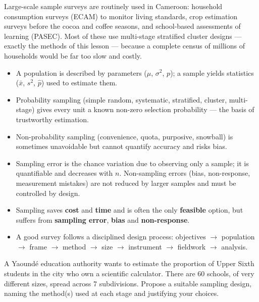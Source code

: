 \documentclass[11pt]{article}
\newcommand{\cle}[1]{{\popxbold\color{popdark}#1}}
\begin{document}
\begin{savaistu}
Large-scale sample surveys are routinely used in Cameroon: household consumption surveys (ECAM) to monitor living standards, crop estimation surveys before the cocoa and coffee seasons, and school-based assessments of learning (PASEC). Most of these use multi-stage stratified cluster designs — exactly the methods of this lesson — because a complete census of millions of households would be far too slow and costly.
\end{savaistu}

\begin{aretenir}
\begin{itemize}
\item A \cle{population} is described by \cle{parameters} ($\mu$, $\sigma^2$, $p$); a \cle{sample} yields \cle{statistics} ($\bar{x}$, $s^2$, $\hat{p}$) used to estimate them.
\item \cle{Probability sampling} (simple random, systematic, stratified, cluster, multi-stage) gives every unit a known non-zero selection probability — the basis of trustworthy estimation.
\item \cle{Non-probability sampling} (convenience, quota, purposive, snowball) is sometimes unavoidable but cannot quantify accuracy and risks bias.
\item \cle{Sampling error} is the chance variation due to observing only a sample; it is quantifiable and decreases with $n$. \cle{Non-sampling errors} (bias, non-response, measurement mistakes) are not reduced by larger samples and must be controlled by design.
\item Sampling saves \textbf{cost} and \textbf{time} and is often the only \textbf{feasible} option, but suffers from \textbf{sampling error}, \textbf{bias} and \textbf{non-response}.
\item A good survey follows a disciplined design process: objectives $\to$ population $\to$ frame $\to$ method $\to$ size $\to$ instrument $\to$ fieldwork $\to$ analysis.
\end{itemize}
\end{aretenir}

\begin{exercice}
A Yaoundé education authority wants to estimate the proportion of Upper Sixth students in the city who own a scientific calculator. There are 60 schools, of very different sizes, spread across 7 subdivisions. Propose a suitable sampling design, naming the method(s) used at each stage and justifying your choices.
\end{exercice}
\end{document}
